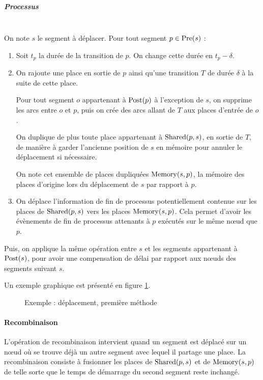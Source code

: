 \subparagraph{Processus} ~ \\

On note $s$ le segment à déplacer.
Pour tout segment $p \in \operatorname{Pre}(s)$ : 

\begin{enumerate}
\item Soit $t_p$ la durée de la transition de $p$. On change cette durée en $t_p - \delta$.
\item On rajoute une place en sortie de $p$ ainsi qu'une transition $T$ de durée $\delta$ à la suite de cette place. 

Pour tout segment $o$ appartenant à $\operatorname{Post}(p)$ à l'exception de $s$, on supprime les arcs entre $o$ et $p$, puis on crée des arcs allant de $T$ aux places d'entrée de $o$.

On duplique de plus toute place appartenant à $\operatorname{Shared}(p, s)$, en sortie de $T$, de manière à garder l'ancienne position de $s$ en mémoire pour annuler le déplacement si nécessaire.

On note cet ensemble de places dupliquées $\operatorname{Memory}(s, p)$, la mémoire des places d'origine lors du déplacement de $s$ par rapport à $p$.
 
\item On déplace l'information de fin de processus potentiellement contenue sur les places de $\operatorname{Shared}(p, s)$ vers les places  $\operatorname{Memory}(s, p)$. Cela permet d'avoir les évènements de fin de processus attenants à $p$ exécutés sur le même nœud que $p$.
\end{enumerate}

Puis, on applique la même opération entre $s$ et les segments appartenant à $\operatorname{Post}(s)$, pour avoir une compensation de délai par rapport aux nœuds des segments suivant $s$.

Un exemple graphique est présenté en figure \ref{fig:deplacementMethode1}.

\begin{figure}[h!]
\centering

\caption{Exemple : déplacement, première méthode}
\label{fig:deplacementMethode1}
\end{figure}

\paragraph{Recombinaison}
L'opération de recombinaison intervient quand un segment est déplacé sur un nœud où se trouve déjà un autre segment avec lequel il partage une place.
La recombinaison consiste à fusionner les places de $\operatorname{Shared}(p, s)$ et de  $\operatorname{Memory}(s, p)$ de telle sorte que le temps de démarrage du second segment reste inchangé.

